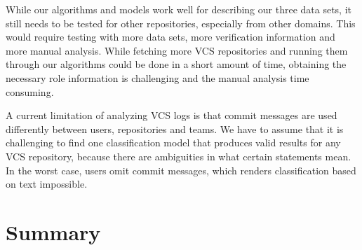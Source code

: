 While our algorithms and models work well for describing our three data sets, it still needs to be tested for other repositories, especially from other domains. This would require testing with more data sets, more verification information and more manual analysis. While fetching more VCS repositories and running them through our algorithms could be done in a short amount of time, obtaining the necessary role information is challenging and the manual analysis time consuming.

A current limitation of analyzing VCS logs is that commit messages are used differently between users, repositories and teams. We have to assume that it is challenging to find one classification model that produces valid results for any VCS repository, because there are ambiguities in what certain statements mean. In the worst case, users omit commit messages, which renders classification based on text impossible.

\section{Summary}\label{sec:conclusion}

